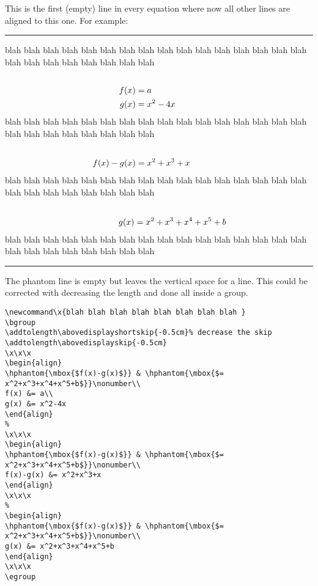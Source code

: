 \begin{table}[htb]
This is the first (empty) line in every equation where now all other lines are aligned to
this one. For example:

\bgroup
\medskip\noindent
\rule{\columnwidth}{1pt}
\newcommand\x{blah blah blah blah blah blah blah blah }
\addtolength\abovedisplayshortskip{-.5cm}%
\addtolength\abovedisplayskip{-.5cm}
\x\x\x
\begin{align}
\hphantom{\mbox{$f(x)-g(x)$}} & \hphantom{\mbox{$= x^2+x^3+x^4+x^5+b$}}\nonumber\\
f(x) &= a\\
g(x) &= x^2-4x
\end{align}
%
\x\x\x
\begin{align}
\hphantom{\mbox{$f(x)-g(x)$}} & \hphantom{\mbox{$= x^2+x^3+x^4+x^5+b$}}\nonumber\\
f(x)-g(x) &= x^2+x^3+x
\end{align}
\x\x\x
%
\begin{align}
\hphantom{\mbox{$f(x)-g(x)$}} & \hphantom{\mbox{$= x^2+x^3+x^4+x^5+b$}}\nonumber\\
g(x) &= x^2+x^3+x^4+x^5+b
\end{align}
\x\x\x

\noindent
\rule{\columnwidth}{1pt}
\egroup
\medskip

The phantom line is empty but leaves the vertical space for a line. This could be
corrected with decreasing the  length and done all
inside a group.

\begin{lstlisting}
\newcommand\x{blah blah blah blah blah blah blah blah }
\bgroup
\addtolength\abovedisplayshortskip{-0.5cm}% decrease the skip
\addtolength\abovedisplayskip{-0.5cm}
\x\x\x
\begin{align}
\hphantom{\mbox{$f(x)-g(x)$}} & \hphantom{\mbox{$= x^2+x^3+x^4+x^5+b$}}\nonumber\\
f(x) &= a\\
g(x) &= x^2-4x
\end{align}
%
\x\x\x
\begin{align}
\hphantom{\mbox{$f(x)-g(x)$}} & \hphantom{\mbox{$= x^2+x^3+x^4+x^5+b$}}\nonumber\\
f(x)-g(x) &= x^2+x^3+x
\end{align}
\x\x\x
%
\begin{align}
\hphantom{\mbox{$f(x)-g(x)$}} & \hphantom{\mbox{$= x^2+x^3+x^4+x^5+b$}}\nonumber\\
g(x) &= x^2+x^3+x^4+x^5+b
\end{align}
\x\x\x
\egroup
\end{lstlisting}





\end{table}
